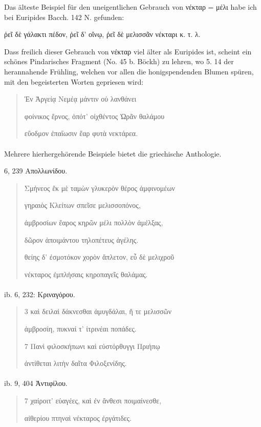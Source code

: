 \documentclass[a4paper, 11pt, oneside]{article}
\begin{document}
Das älteste Beispiel für den uneigentlichen Gebrauch von νέκταρ = μέλι habe ich bei Euripides Bacch. 142 N. gefunden:

ῥεῖ δὲ γάλακτι πέδον, ῥεῖ δ' οἴνῳ, ῥεῖ δὲ μελισσᾶν νέκταρι κ. τ. λ.

Dass freilich dieser Gebrauch von νέκταρ viel älter als Euripides ist, scheint ein schönes Pindarisches Fragment (No. 45 b. Böckh) zu lehren, wo 5. 14 der herannahende Frühling, welchen vor allen die honigspendenden Blumen spüren, mit den begeisterten Worten gepriesen wird:
\begin{quotation}
Ἐν Ἀργείᾳ Νεμέᾳ μάντιν οὐ λανθάνει

φοίνικος ἔρνος, ὁπότ' οἰχθέντος Ὡρᾶν θαλάμου

εὔοδμον ἐπαΐωσιν ἔαρ φυτὰ νεκτάρεα.
\end{quotation}
\paragraph{}
Mehrere hierhergehörende Beispiele bietet die griechische Anthologie.

6, 239 Απολλωνίδου.
\begin{quotation}
Σμήνεος ἔκ μὲ ταμὼν γλυκερὸν θέρος ἀμφινομέων

\hspace*{5mm}γηραιὸς Κλείτων σπεῖσε μελισσοπόνος,

ἀμβροσίων ἔαρος κηρῶν μέλι πολλὸν ἀμέλξας,

\hspace*{5mm}δῶρον ἀποιμάντου τηλοπέτευς ἀγέλης.

θείης δ' ἐσμοτόκον χορὸν ἄπλετον, εὖ δὲ μελιχροῦ

\hspace*{5mm}νέκταρος ἐμπλήσαις κηροπαγεῖς θαλάμας.
\end{quotation}
\paragraph{}
ib. 6, 232: Κριναγόρου.
\begin{quotation}
3 καὶ δειλαὶ δάκνεσθαι ἀμυγδάλαι, ἥ τε μελισσῶν

\hspace*{5mm}ἀμβροσίη, πυκναί τ' ἰτρινέαι ποπάδες.

7 Πανὶ φιλοσκήπωνι καὶ εὐστόρθυγγι Πριήπῳ

\hspace*{5mm}ἀντίθεται λιτὴν δαῖτα Φιλοξενίδης.
\end{quotation}
\paragraph{}
ib. 9, 404 Ἀντιφίλου.
\begin{quotation}
7 χαίροιτ' εὐαγέες, καὶ ἐν ἄνθεσι ποιμαίνεσθε,

\hspace*{5mm}αἰθερίου πτηναὶ νέκταρος ἐργάτιδες.
\end{quotation}
\end{document}

